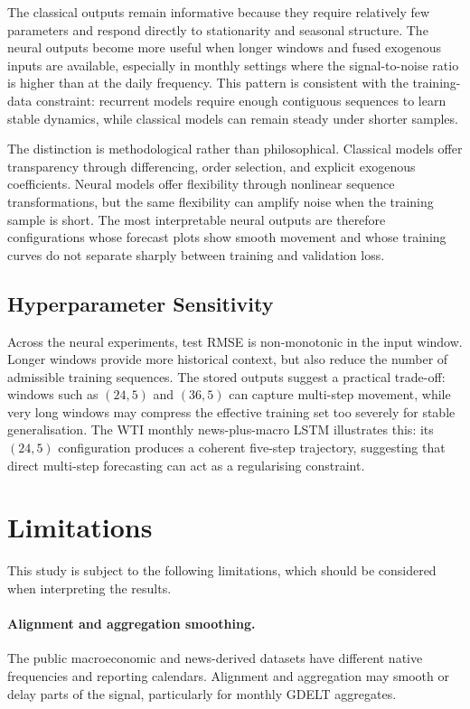 \documentclass[12pt,a4paper]{article}
\begin{document}
The classical outputs remain informative because they require relatively few parameters and respond directly to stationarity and seasonal structure. The neural outputs become more useful when longer windows and fused exogenous inputs are available, especially in monthly settings where the signal-to-noise ratio is higher than at the daily frequency. This pattern is consistent with the training-data constraint: recurrent models require enough contiguous sequences to learn stable dynamics, while classical models can remain steady under shorter samples.

The distinction is methodological rather than philosophical. Classical models offer transparency through differencing, order selection, and explicit exogenous coefficients. Neural models offer flexibility through nonlinear sequence transformations, but the same flexibility can amplify noise when the training sample is short. The most interpretable neural outputs are therefore configurations whose forecast plots show smooth movement and whose training curves do not separate sharply between training and validation loss.

\subsection{Hyperparameter Sensitivity}

Across the neural experiments, test RMSE is non-monotonic in the input window. Longer windows provide more historical context, but also reduce the number of admissible training sequences. The stored outputs suggest a practical trade-off: windows such as $(24,5)$ and $(36,5)$ can capture multi-step movement, while very long windows may compress the effective training set too severely for stable generalisation. The WTI monthly news-plus-macro LSTM illustrates this: its $(24,5)$ configuration produces a coherent five-step trajectory, suggesting that direct multi-step forecasting can act as a regularising constraint.

\section{Limitations}\label{sec:limits}

This study is subject to the following limitations, which should be considered when interpreting the results.

\paragraph{Alignment and aggregation smoothing.} The public macroeconomic and news-derived datasets have different native frequencies and reporting calendars. Alignment and aggregation may smooth or delay parts of the signal, particularly for monthly GDELT aggregates.
\end{document}

